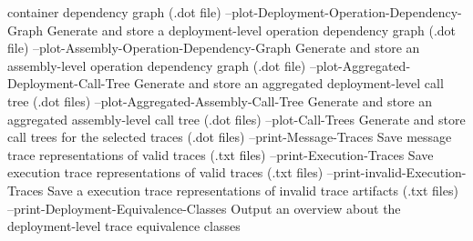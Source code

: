                                                         container dependency
                                                        graph (.dot file)
    --plot-Deployment-Operation-Dependency-Graph        Generate and store a
                                                        deployment-level
                                                        operation dependency
                                                        graph (.dot file)
    --plot-Assembly-Operation-Dependency-Graph          Generate and store an
                                                        assembly-level operation
                                                        dependency graph (.dot
                                                        file)
    --plot-Aggregated-Deployment-Call-Tree              Generate and store an
                                                        aggregated
                                                        deployment-level call
                                                        tree (.dot files)
    --plot-Aggregated-Assembly-Call-Tree                Generate and store an
                                                        aggregated
                                                        assembly-level call tree
                                                        (.dot files)
    --plot-Call-Trees                                   Generate and store call
                                                        trees for the selected
                                                        traces (.dot files)
    --print-Message-Traces                              Save message trace
                                                        representations of valid
                                                        traces (.txt files)
    --print-Execution-Traces                            Save execution trace
                                                        representations of valid
                                                        traces (.txt files)
    --print-invalid-Execution-Traces                    Save a execution trace
                                                        representations of
                                                        invalid trace artifacts
                                                        (.txt files)
    --print-Deployment-Equivalence-Classes              Output an overview about
                                                        the deployment-level
                                                        trace equivalence
                                                        classes
